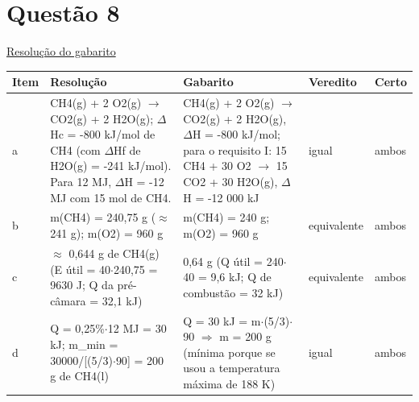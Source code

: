 \documentclass{article}%
\begin{document}
\section*{Questão 8}%
\href{https://poliedroresolve.sistemapoliedro.com.br/vestibulares/ita/2026/ita-2-fase-dia-2-29-10-2025-2-fase-dia-2/dissertativa-8-quimica-2-fase-dia-2-ita-2026}{Resolução do gabarito}\par\smallskip%
\begin{longtable}{@{}p{} p{} p{} p{} p{}@{}}\toprule Item & Resolução & Gabarito & Veredito & Certo \\ \midrule
a & CH4(g) + 2 O2(g) $\to$ CO2(g) + 2 H2O(g); $\Delta$Hc = -800 kJ/mol de CH4 (com $\Delta$Hf de H2O(g) = -241 kJ/mol). Para 12 MJ, $\Delta$H = -12 MJ com 15 mol de CH4. & CH4(g) + 2 O2(g) $\to$ CO2(g) + 2 H2O(g), $\Delta$H = -800 kJ/mol; para o requisito I: 15 CH4 + 30 O2 $\to$ 15 CO2 + 30 H2O(g), $\Delta$H = -12 000 kJ & igual & ambos \\
b & m(CH4) = 240,75 g ($\approx$ 241 g); m(O2) = 960 g & m(CH4) = 240 g; m(O2) = 960 g & equivalente & ambos \\
c & $\approx$ 0,644 g de CH4(g) (E útil = 40$\cdot$240,75 = 9630 J; Q da pré{-}câmara = 32,1 kJ) & 0,64 g (Q útil = 240$\cdot$40 = 9,6 kJ; Q de combustão = 32 kJ) & equivalente & ambos \\
d & Q = 0,25\%$\cdot$12 MJ = 30 kJ; m\_min = 30000/{[}(5/3)$\cdot$90{]} = 200 g de CH4(l) & Q = 30 kJ = m$\cdot$(5/3)$\cdot$90 $\Rightarrow$ m = 200 g (mínima porque se usou a temperatura máxima de 188 K) & igual & ambos \\
\bottomrule\end{longtable}%
\end{document}

